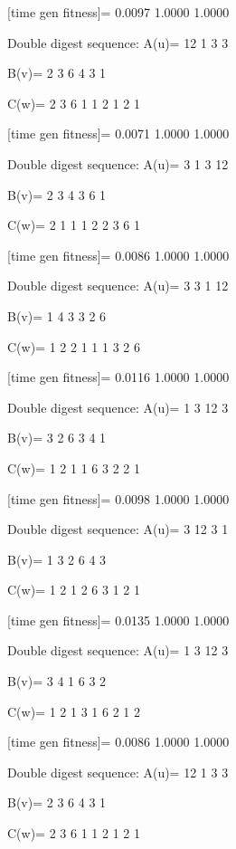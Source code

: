 [time gen fitness]=
    0.0097    1.0000    1.0000

Double digest sequence:
A(u)=
    12     1     3     3

B(v)=
     2     3     6     4     3     1

C(w)=
     2     3     6     1     1     2     1     2     1

[time gen fitness]=
    0.0071    1.0000    1.0000

Double digest sequence:
A(u)=
     3     1     3    12

B(v)=
     2     3     4     3     6     1

C(w)=
     2     1     1     1     2     2     3     6     1

[time gen fitness]=
    0.0086    1.0000    1.0000

Double digest sequence:
A(u)=
     3     3     1    12

B(v)=
     1     4     3     3     2     6

C(w)=
     1     2     2     1     1     1     3     2     6

[time gen fitness]=
    0.0116    1.0000    1.0000

Double digest sequence:
A(u)=
     1     3    12     3

B(v)=
     3     2     6     3     4     1

C(w)=
     1     2     1     1     6     3     2     2     1

[time gen fitness]=
    0.0098    1.0000    1.0000

Double digest sequence:
A(u)=
     3    12     3     1

B(v)=
     1     3     2     6     4     3

C(w)=
     1     2     1     2     6     3     1     2     1

[time gen fitness]=
    0.0135    1.0000    1.0000

Double digest sequence:
A(u)=
     1     3    12     3

B(v)=
     3     4     1     6     3     2

C(w)=
     1     2     1     3     1     6     2     1     2

[time gen fitness]=
    0.0086    1.0000    1.0000

Double digest sequence:
A(u)=
    12     1     3     3

B(v)=
     2     3     6     4     3     1

C(w)=
     2     3     6     1     1     2     1     2     1

